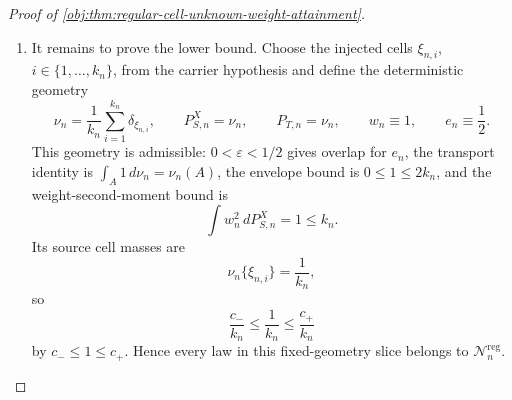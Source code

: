 \begin{proof}[Proof of \cref{obj:thm:regular-cell-unknown-weight-attainment}]
\begin{enumerate}
\item It remains to prove the lower bound. Choose the injected cells \(\xi_{n,i}\), \(i\in\{1,\ldots,k_n\}\), from the carrier hypothesis and define the deterministic geometry
\[
\nu_n=\frac1{k_n}\sum_{i=1}^{k_n}\delta_{\xi_{n,i}},
\qquad
P_{S,n}^X=\nu_n,
\qquad
P_{T,n}=\nu_n,
\qquad
w_n\equiv1,
\qquad
e_n\equiv\frac12 .
\]
This geometry is admissible: \(0<\varepsilon<1/2\) gives overlap for \(e_n\), the transport identity is \(\int_A1\,d\nu_n=\nu_n(A)\), the envelope bound is \(0\le1\le2k_n\), and the weight-second-moment bound is
\[
\int w_n^2\,dP_{S,n}^X=1\le k_n.
\]
Its source cell masses are
\[
\nu_n\{\xi_{n,i}\}=\frac1{k_n},
\]
so
\[
\frac{c_-}{k_n}\le \frac1{k_n}\le \frac{c_+}{k_n}
\]
by \(c_-\le1\le c_+\). Hence every law in this fixed-geometry slice belongs to \(\mathcal N_n^{\mathrm{reg}}\).


\end{enumerate}
\end{proof}
